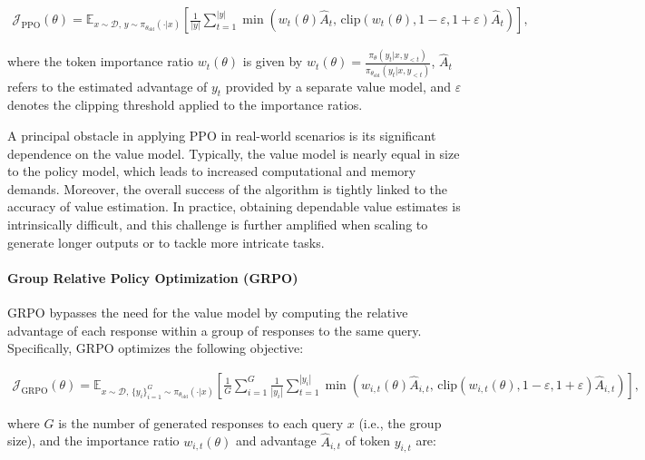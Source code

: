 \begin{align}
\mathcal{J}_\text{PPO}(\theta) = \mathbb{E}_{ x \sim \mathcal{D},\, y \sim \pi_{\theta_\text{old}}( \cdot | x) }
\left[ \frac{1}{|y|} \sum_{t=1}^{|y|} 
\min \left( w_{t}(\theta) \widehat{A}_{t},  \, \mathrm{clip} \left( w_{t}(\theta), 1 - {\varepsilon}, 1 + {\varepsilon}\right) \widehat{A}_{t} \right)
\right],
\end{align}

where the token importance ratio $w_{t}(\theta)$ is given by $
w_{t}(\theta) = \frac{ \pi_{\theta} (y_{t} | x, y_{<t}) }{ \pi_{\theta_\text{old}} (y_{t} | x,y_{<t})} $, $\widehat{A}_{t}$ refers to the estimated advantage of $y_t$ provided by a separate value model, and $\varepsilon$ denotes the clipping threshold applied to the importance ratios.

A principal obstacle in applying PPO in real-world scenarios is its significant dependence on the value model. Typically, the value model is nearly equal in size to the policy model, which leads to increased computational and memory demands. Moreover, the overall success of the algorithm is tightly linked to the accuracy of value estimation. In practice, obtaining dependable value estimates is intrinsically difficult, and this challenge is further amplified when scaling to generate longer outputs or to tackle more intricate tasks.

\paragraph{Group Relative Policy Optimization (GRPO)} GRPO \citep{grpo} bypasses the need for the value model by computing the relative advantage of each response within a group of responses to the same query. Specifically, GRPO optimizes the following objective:

\begin{align}
\label{equ:grpo}
\mathcal{J}_\text{GRPO}(\theta) = \mathbb{E}_{ x \sim \mathcal{D},\, \{y_i\}_{i=1}^G \sim \pi_{\theta_\text{old}}( \cdot | x) }
\left[ \frac{1}{G} \sum_{i=1}^{G} \frac{1}{|y_i|} \sum_{t=1}^{|y_i|} 
\min \left( w_{i,t}(\theta) \widehat{A}_{i,t},  \, \mathrm{clip} \left( w_{i,t}(\theta), 1 - {\varepsilon}, 1 + {\varepsilon}\right) \widehat{A}_{i,t} \right)
\right],
\end{align}

where $G$ is the number of generated responses to each query $x$ (i.e., the group size), and the importance ratio $w_{i,t}(\theta)$ and advantage $\widehat{A}_{i,t}$ of token $y_{i,t}$ are:

